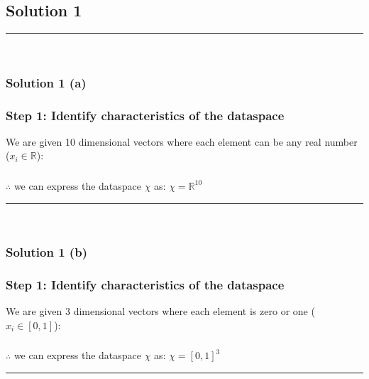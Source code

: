 \documentclass{article}
\begin{document}
\pagestyle{fancy}

\subsection*{Solution 1}
\noindent\rule{\textwidth}{0.4pt}\\

\subsubsection*{Solution 1 (a)}
\subsubsection*{Step 1: Identify characteristics of the dataspace}
\parbox{\textwidth}{
We are given 10 dimensional vectors where each element can be any real number ($x_{i} \in \mathbb{R}$):
}


\subsubsection*{\normalfont}{$\therefore$ we can express the dataspace $\chi$ as: $\chi = \mathbb{R}^{10}$}

\noindent\rule{\textwidth}{0.4pt}\\

\subsubsection*{Solution 1 (b)}
\subsubsection*{Step 1: Identify characteristics of the dataspace}
\parbox{\textwidth}{
We are given 3 dimensional vectors where each element is zero or one ($x_{i} \in [0,1]$):
}

\subsubsection*{\normalfont}{$\therefore$ we can express the dataspace $\chi$ as: $\chi = {[0,1]}^{3}$}

\noindent\rule{\textwidth}{0.4pt}\\

\newpage

\end{document}
